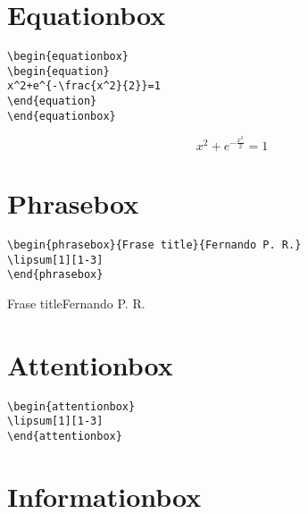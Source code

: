 
\section{Equationbox}

\begin{verbatim}
\begin{equationbox}
\begin{equation}
x^2+e^{-\frac{x^2}{2}}=1
\end{equation}
\end{equationbox}
\end{verbatim}
\begin{equationbox}
\begin{equation}
x^2+e^{-\frac{x^2}{2}}=1
\end{equation}
\end{equationbox}


\section{Phrasebox}

\begin{verbatim}
\begin{phrasebox}{Frase title}{Fernando P. R.}
\lipsum[1][1-3]
\end{phrasebox}
\end{verbatim}
\begin{phrasebox}{Frase title}{Fernando P. R.}
\lipsum[1][1-3]
\end{phrasebox}

\section{Attentionbox}

\lipsum[1][1-3]

\begin{verbatim}
\begin{attentionbox}
\lipsum[1][1-3] 
\end{attentionbox}
\end{verbatim}
\begin{attentionbox}
\lipsum[1][1-3] 
\end{attentionbox}



\section{Informationbox}

